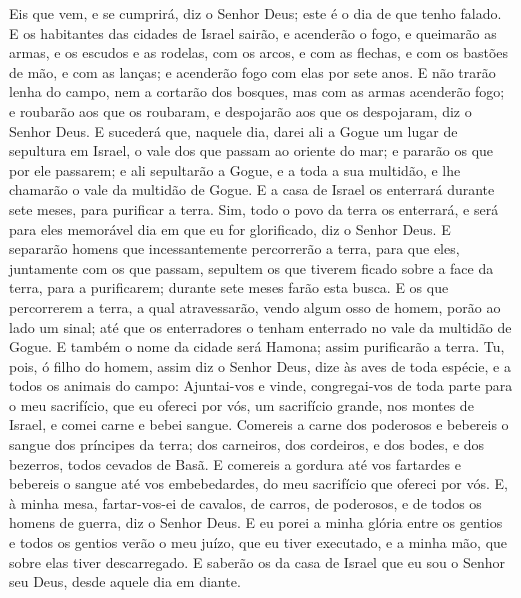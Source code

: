 Eis que vem, e se cumprirá, diz o Senhor Deus; este é o dia de que
tenho falado. E os habitantes das cidades de Israel sairão, e
acenderão o fogo, e queimarão as armas, e os escudos e as rodelas,
com os arcos, e com as flechas, e com os bastões de mão, e com as
lanças; e acenderão fogo com elas por sete anos. E não trarão
lenha do campo, nem a cortarão dos bosques, mas com as armas
acenderão fogo; e roubarão aos que os roubaram, e despojarão aos que
os despojaram, diz o Senhor Deus. E sucederá que, naquele
dia, darei ali a Gogue um lugar de sepultura em Israel, o vale dos
que passam ao oriente do mar; e pararão os que por ele passarem; e
ali sepultarão a Gogue, e a toda a sua multidão, e lhe chamarão o
vale da multidão de Gogue. E a casa de Israel os enterrará
durante sete meses, para purificar a terra. Sim, todo o povo
da terra os enterrará, e será para eles memorável dia em que eu for
glorificado, diz o Senhor Deus. E separarão homens que
incessantemente percorrerão a terra, para que eles, juntamente com
os que passam, sepultem os que tiverem ficado sobre a face da terra,
para a purificarem; durante sete meses farão esta busca. E os
que percorrerem a terra, a qual atravessarão, vendo algum osso de
homem, porão ao lado um sinal; até que os enterradores o tenham
enterrado no vale da multidão de Gogue. E também o nome da
cidade será Hamona; assim purificarão a terra. Tu, pois, ó
filho do homem, assim diz o Senhor Deus, dize às aves de toda
espécie, e a todos os animais do campo: Ajuntai-vos e vinde,
congregai-vos de toda parte para o meu sacrifício, que eu ofereci
por vós, um sacrifício grande, nos montes de Israel, e comei carne e
bebei sangue. Comereis a carne dos poderosos e bebereis o
sangue dos príncipes da terra; dos carneiros, dos cordeiros, e dos
bodes, e dos bezerros, todos cevados de Basã. E comereis a
gordura até vos fartardes e bebereis o sangue até vos embebedardes,
do meu sacrifício que ofereci por vós. E, à minha mesa,
fartar-vos-ei de cavalos, de carros, de poderosos, e de todos os
homens de guerra, diz o Senhor Deus. E eu porei a minha
glória entre os gentios e todos os gentios verão o meu juízo, que eu
tiver executado, e a minha mão, que sobre elas tiver descarregado.
E saberão os da casa de Israel que eu sou o Senhor seu Deus,
desde aquele dia em diante.

